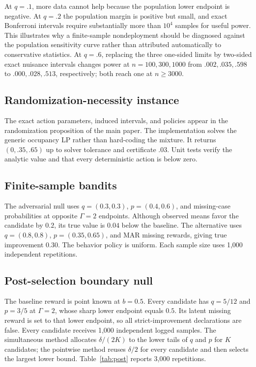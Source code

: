 \documentclass[letterpaper]{article}
\begin{document}
At $q=.1$, more data cannot help because the population lower endpoint is negative. At $q=.2$ the population margin is positive but small, and exact Bonferroni intervals require substantially more than $10^4$ samples for useful power. This illustrates why a finite-sample nondeployment should be diagnosed against the population sensitivity curve rather than attributed automatically to conservative statistics. At $q=.6$, replacing the three one-sided limits by two-sided exact nuisance intervals changes power at $n=100,300,1000$ from $.002,.035,.598$ to $.000,.028,.513$, respectively; both reach one at $n\geq3000$.

\subsection{Randomization-necessity instance}
The exact action parameters, induced intervals, and policies appear in the randomization proposition of the main paper. The implementation solves the generic occupancy LP rather than hard-coding the mixture. It returns $(0,.35,.65)$ up to solver tolerance and certificate $.03$. Unit tests verify the analytic value and that every deterministic action is below zero.

\subsection{Finite-sample bandits}
The adversarial null uses $q=(0.3,0.3)$, $p=(0.4,0.6)$, and missing-case probabilities at opposite $\Gamma=2$ endpoints. Although observed means favor the candidate by $0.2$, its true value is $0.04$ below the baseline. The alternative uses $q=(0.8,0.8)$, $p=(0.35,0.65)$, and MAR missing rewards, giving true improvement $0.30$. The behavior policy is uniform. Each sample size uses 1,000 independent repetitions.

\subsection{Post-selection boundary null}
The baseline reward is point known at $b=0.5$. Every candidate has $q=5/12$ and $p=3/5$ at $\Gamma=2$, whose sharp lower endpoint equals $0.5$. Its latent missing reward is set to that lower endpoint, so all strict-improvement declarations are false. Every candidate receives 1,000 independent logged samples. The simultaneous method allocates $\delta/(2K)$ to the lower tails of $q$ and $p$ for $K$ candidates; the pointwise method reuses $\delta/2$ for every candidate and then selects the largest lower bound. Table~\ref{tab:post} reports 3,000 repetitions.
\end{document}
